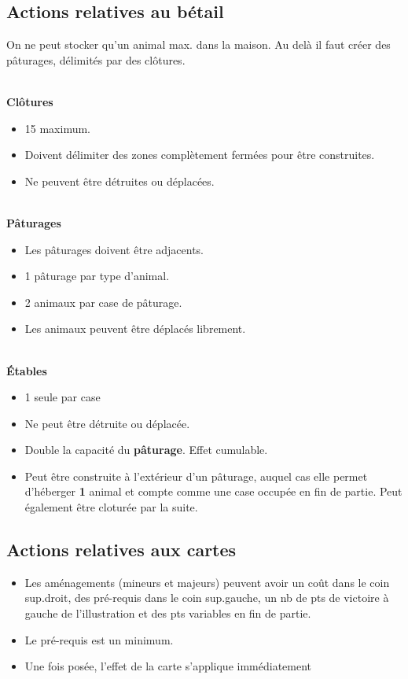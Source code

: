 \documentclass[10pt, a4paper]{article}	%
\begin{document}
\begin{multicols}{3}
\subsection{Actions relatives au bétail}
On ne peut stocker qu'un animal max. dans la maison. Au delà il faut créer des pâturages, délimités par des clôtures.

\textbf{\\Clôtures}
\begin{itemize}
\item 15 maximum.
\item Doivent délimiter des zones complètement fermées pour être construites.
\item Ne peuvent être détruites ou déplacées.
\end{itemize}

\textbf{\\Pâturages}
\begin{itemize}
\item Les pâturages doivent être adjacents.
\item 1 pâturage par type d'animal.
\item 2 animaux par case de pâturage.
\item Les animaux peuvent être déplacés librement.
\end{itemize}


\textbf{\\Étables}
\begin{itemize}
\item 1 seule par case
\item Ne peut être détruite ou déplacée.
\item Double la capacité du \textbf{pâturage}. Effet cumulable.
\item Peut être construite à l'extérieur d'un pâturage, auquel cas elle permet d'héberger \textbf{1} animal et compte comme une case occupée en fin de partie. Peut également être cloturée par la suite.
\end{itemize}


\subsection{Actions relatives aux cartes}
\begin{itemize}
\item Les aménagements (mineurs et majeurs) peuvent avoir un coût dans le coin sup.droit, des pré-requis dans le coin sup.gauche, un nb de pts de victoire à gauche de l'illustration et des pts variables en fin de partie.
\item Le pré-requis est un minimum.
\item Une fois posée, l'effet de la carte s'applique immédiatement
\end{itemize}




\end{multicols}
\end{document}
